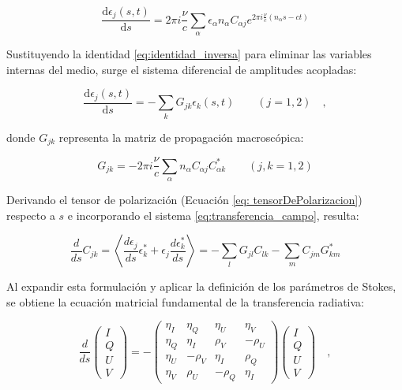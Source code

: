 \begin{equation}
    \frac{\text{d}\epsilon_j(s,t)}{\text{d}s} = 2\pi i \frac{\nu}{c} \sum_\alpha \epsilon_\alpha n_\alpha C_{\alpha j} e^{2\pi i \frac{\nu}{c}(n_\alpha s - ct)}
\end{equation}

Sustituyendo la identidad \ref{eq:identidad_inversa} para eliminar las variables internas del medio, surge el sistema diferencial de amplitudes acopladas:

\begin{equation}
    \frac{\text{d}\epsilon_j(s,t)}{\text{d}s} = -\sum_k G_{jk} \epsilon_k(s,t) \qquad (j=1,2) \quad,
    \label{eq:transferencia_campo}
\end{equation}

donde $G_{jk}$ representa la matriz de propagación macroscópica:

\begin{equation}
    G_{jk} = -2\pi i \frac{\nu}{c} \sum_\alpha n_\alpha C_{\alpha j} C_{\alpha k}^* \qquad (j,k = 1,2)
\end{equation}

Derivando el tensor de polarización (Ecuación \ref{eq: tensorDePolarizacion}) respecto a $s$ e incorporando el sistema \ref{eq:transferencia_campo}, resulta:

\begin{equation}
    \label{eq:derivada_polarizacion}
    \frac{d}{ds} C_{jk} = \left\langle \frac{d\epsilon_j}{ds} \epsilon_k^* + \epsilon_j \frac{d\epsilon_k^*}{ds} \right\rangle = -\sum_l G_{jl} C_{lk} - \sum_m C_{jm} G_{km}^*
\end{equation}

Al expandir esta formulación y aplicar la definición de los parámetros de Stokes, se obtiene la ecuación matricial fundamental de la transferencia radiativa:

\begin{equation}
    \label{eq:transfMatriz}
    \frac{d}{ds}
    \begin{pmatrix}
    I \\ Q \\ U \\ V
    \end{pmatrix}
    = -
    \begin{pmatrix}
    \eta_I & \eta_Q & \eta_U & \eta_V \\
    \eta_Q & \eta_I & \rho_V & -\rho_U \\
    \eta_U & -\rho_V & \eta_I & \rho_Q \\
    \eta_V & \rho_U & -\rho_Q & \eta_I
    \end{pmatrix}
    \begin{pmatrix}
    I \\ Q \\ U \\ V
    \end{pmatrix} \quad,
\end{equation}

